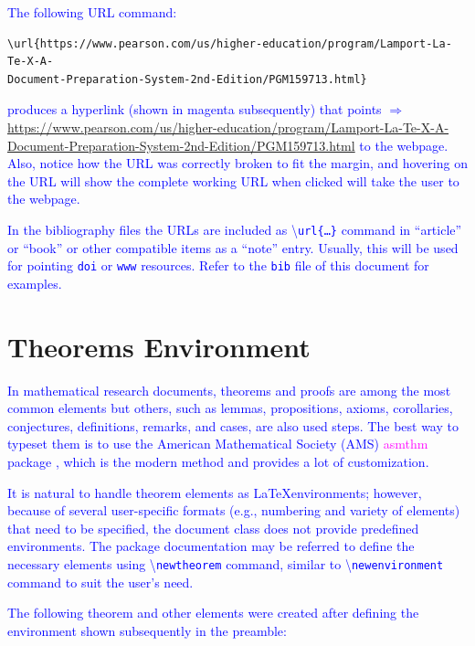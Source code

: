 \documentclass[phd]{ndsu-thesis-2022}
\newcommand\italk[1]{\textcolor{blue}{#1}}  %
\newcommand\cmd[1]{\textbackslash\texttt{#1}}  %
\begin{document}
\italk{The following URL command:} 
\vspace{-2ex}
\begin{verbatim}
\url{https://www.pearson.com/us/higher-education/program/Lamport-La-Te-X-A-
Document-Preparation-System-2nd-Edition/PGM159713.html}
\end{verbatim}

\noindent \italk{produces a hyperlink (shown in magenta subsequently) that points $\Rightarrow$ }\textcolor{magenta}{\url{https://www.pearson.com/us/higher-education/program/Lamport-La-Te-X-A-Document-Preparation-System-2nd-Edition/PGM159713.html}} \italk{to the webpage. Also, notice how the URL was correctly broken to fit the margin, and hovering on the URL will show the complete working URL when clicked will take the user to the webpage.}

\italk{In the bibliography files the URLs are included as \cmd{url\{\ldots\}} command in ``article'' or ``book'' or other compatible items as a ``note'' entry. Usually, this will be used for pointing \texttt{doi} or \texttt{www} resources. Refer to the \texttt{bib} file of this document for examples. } 

\section{Theorems Environment}

\italk{In mathematical research documents, theorems and proofs are among the most common elements but others, such as lemmas, propositions, axioms, corollaries, conjectures, definitions, remarks, and cases, are also used steps. The best way to typeset them is to use the American Mathematical Society (AMS) \textcolor{magenta}{asmthm} package \citep{amsthm2017}, which is the modern method and provides a lot of customization.} 

\italk{It is natural to handle theorem elements as \LaTeX environments; however, because of several user-specific formats (e.g., numbering and variety of elements) that need to be specified, the document class does not provide predefined environments. The package documentation may be referred to define the necessary elements using \cmd{newtheorem} command, similar to \cmd{newenvironment} command to suit the user's need.} 

\italk{The following theorem and other elements were created after defining the environment shown subsequently in the preamble:}
\end{document}
